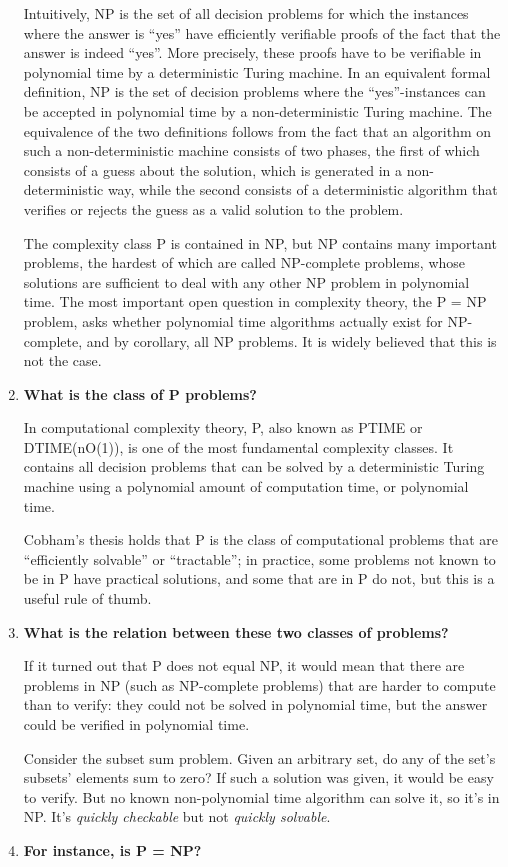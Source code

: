 \documentclass[a4paper,11pt]{article}
\begin{document}
\begin{enumerate}
  Intuitively, NP is the set of all decision problems for which the
  instances where the answer is ``yes'' have efficiently verifiable
  proofs of the fact that the answer is indeed ``yes''. More precisely,
  these proofs have to be verifiable in polynomial time by a
  deterministic Turing machine. In an equivalent formal definition, NP
  is the set of decision problems where the ``yes''-instances can be
  accepted in polynomial time by a non-deterministic Turing machine. The
  equivalence of the two definitions follows from the fact that an
  algorithm on such a non-deterministic machine consists of two phases,
  the first of which consists of a guess about the solution, which is
  generated in a non-deterministic way, while the second consists of a
  deterministic algorithm that verifies or rejects the guess as a valid
  solution to the problem.

  The complexity class P is contained in NP, but NP contains many
  important problems, the hardest of which are called NP-complete
  problems, whose solutions are sufficient to deal with any other NP
  problem in polynomial time. The most important open question in
  complexity theory, the P = NP problem, asks whether polynomial time
  algorithms actually exist for NP-complete, and by corollary, all NP
  problems. It is widely believed that this is not the case.
\item
  \textbf{What is the class of P problems?}

  In computational complexity theory, P, also known as PTIME or
  DTIME(nO(1)), is one of the most fundamental complexity classes. It
  contains all decision problems that can be solved by a deterministic
  Turing machine using a polynomial amount of computation time, or
  polynomial time.

  Cobham's thesis holds that P is the class of computational problems
  that are ``efficiently solvable'' or ``tractable''; in practice, some
  problems not known to be in P have practical solutions, and some that
  are in P do not, but this is a useful rule of thumb.
\item
  \textbf{What is the relation between these two classes of problems?}

  If it turned out that P does not equal NP, it would mean that there
  are problems in NP (such as NP-complete problems) that are harder to
  compute than to verify: they could not be solved in polynomial time,
  but the answer could be verified in polynomial time.

  Consider the subset sum problem. Given an arbitrary set, do any of the
  set's subsets' elements sum to zero? If such a solution was given, it
  would be easy to verify. But no known non-polynomial time algorithm
  can solve it, so it's in NP. It's \emph{quickly checkable} but not
  \emph{quickly solvable}.
\item
  \textbf{For instance, is P = NP?}


\end{enumerate}
\end{document}
